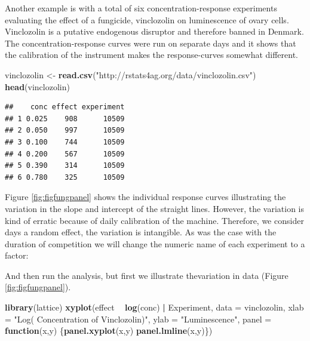 \documentclass[letterpaper,]{book}
\newenvironment{Shaded}{\begin{snugshade}}{\end{snugshade}}
\newcommand{\ControlFlowTok}[1]{\textcolor[rgb]{0.13,0.29,0.53}{\textbf{#1}}}
\newcommand{\DataTypeTok}[1]{\textcolor[rgb]{0.13,0.29,0.53}{#1}}
\newcommand{\KeywordTok}[1]{\textcolor[rgb]{0.13,0.29,0.53}{\textbf{#1}}}
\newcommand{\NormalTok}[1]{#1}
\newcommand{\OperatorTok}[1]{\textcolor[rgb]{0.81,0.36,0.00}{\textbf{#1}}}
\newcommand{\StringTok}[1]{\textcolor[rgb]{0.31,0.60,0.02}{#1}}
\begin{document}
Another example is with a total of six concentration-response experiments evaluating
the effect of a fungicide, vinclozolin on luminescence of ovary cells. Vinclozolin is a putative endogenous disruptor and therefore banned in Denmark. The concentration-response curves were run on separate days and it shows that the calibration of the instrument makes the response-curves somewhat different.

\begin{Shaded}
\begin{Highlighting}[]
\NormalTok{vinclozolin <-}\StringTok{ }\KeywordTok{read.csv}\NormalTok{(}\StringTok{"http://rstats4ag.org/data/vinclozolin.csv"}\NormalTok{)}
\KeywordTok{head}\NormalTok{(vinclozolin)}
\end{Highlighting}
\end{Shaded}

\begin{verbatim}
##    conc effect experiment
## 1 0.025    908      10509
## 2 0.050    997      10509
## 3 0.100    744      10509
## 4 0.200    567      10509
## 5 0.390    314      10509
## 6 0.780    325      10509
\end{verbatim}

Figure \ref{fig:figfungpanel} shows the individual response curves illustrating the variation in the slope and intercept of the straight lines. However, the variation is kind of erratic because of daily calibration of the machine. Therefore, we consider days a random effect, the variation is intangible. As was the case with the duration of competition we will change the numeric name of each experiment to a factor:

\begin{Shaded}
\end{Shaded}

And then run the analysis, but first we illustrate thevariation in data (Figure \ref{fig:figfungpanel}).



\begin{Shaded}
\begin{Highlighting}[]
\KeywordTok{library}\NormalTok{(lattice)}
\KeywordTok{xyplot}\NormalTok{(effect }\OperatorTok{~}\StringTok{ }\KeywordTok{log}\NormalTok{(conc) }\OperatorTok{|}\StringTok{ }\NormalTok{Experiment, }\DataTypeTok{data =}\NormalTok{ vinclozolin,}
       \DataTypeTok{xlab =} \StringTok{"Log( Concentration of Vinclozolin)"}\NormalTok{, }\DataTypeTok{ylab =} \StringTok{"Luminescence"}\NormalTok{,}
       \DataTypeTok{panel =} \ControlFlowTok{function}\NormalTok{(x,y)}
\NormalTok{         \{}\KeywordTok{panel.xyplot}\NormalTok{(x,y)}
          \KeywordTok{panel.lmline}\NormalTok{(x,y)\})}
\end{Highlighting}
\end{Shaded}
\end{document}
